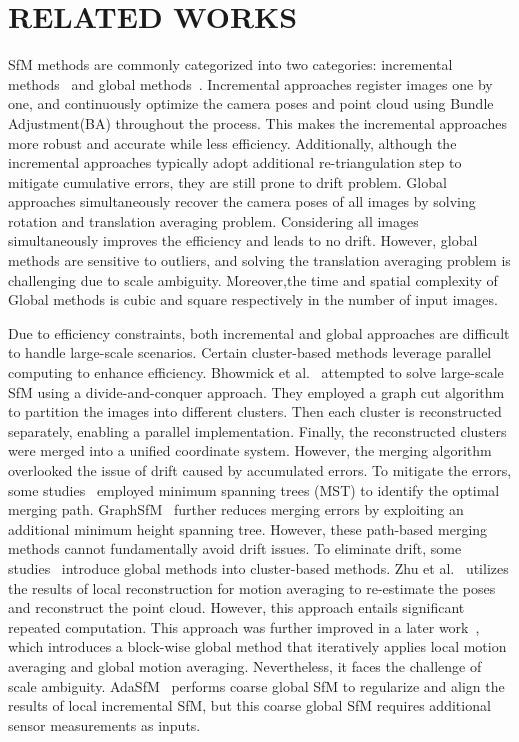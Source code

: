 \documentclass[runningheads]{llncs}
\begin{document}
\section{RELATED WORKS}
SfM methods are commonly categorized into two categories: incremental methods~\cite{mvg,colmap} and global methods~\cite{Revisiting_ra}. Incremental approaches register images one by one, and continuously optimize the camera poses and point cloud using Bundle Adjustment(BA) throughout the process. This makes the incremental approaches more robust and accurate while less efficiency. Additionally, although the incremental approaches typically adopt additional re-triangulation step to mitigate cumulative errors, they are still prone to drift problem. Global approaches simultaneously recover the camera poses of all images by solving rotation and translation averaging problem. Considering all images simultaneously improves the efficiency and leads to no drift. However, global methods are sensitive to outliers, and solving the translation averaging problem is challenging due to scale ambiguity. Moreover,the time and spatial complexity of Global methods is cubic and square respectively in the number of input images. 

Due to efficiency constraints, both incremental and global approaches are difficult to handle large-scale scenarios. Certain cluster-based methods leverage parallel computing to enhance efficiency. Bhowmick et al.~\cite{Divide_conquer} attempted to solve large-scale SfM using a divide-and-conquer approach. They employed a graph cut algorithm~\cite{NCUT} to partition the images into different clusters. Then each cluster is reconstructed separately, enabling a parallel implementation. Finally, the reconstructed clusters were merged into a unified coordinate system. 
However, the merging algorithm overlooked the issue of drift caused by accumulated errors. To mitigate the errors, some studies~\cite{TC-SfM,merge} employed minimum spanning trees (MST) to identify the optimal merging path. GraphSfM~\cite{gsfm} further reduces merging errors by exploiting an additional minimum height spanning tree. However, these path-based merging methods cannot fundamentally avoid drift issues. To eliminate drift, some studies~\cite{AccPara,large_averaging,AdaSfM} introduce global methods into cluster-based methods. Zhu et al.~\cite{AccPara} utilizes the results of local reconstruction for motion averaging to re-estimate the poses and reconstruct the point cloud. However, this approach entails significant repeated computation. This approach was further improved in a later work~\cite{large_averaging}, which introduces a block-wise global method that iteratively applies local motion averaging and global motion averaging. Nevertheless, it faces the challenge of scale ambiguity. AdaSfM~\cite{AdaSfM} performs coarse global SfM to regularize and align the results of local incremental SfM, but this coarse global SfM requires additional sensor measurements as inputs. 
\end{document}
